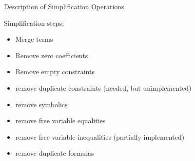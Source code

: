 \documentclass{book}
\begin{document}
\begin{section}{Description of Simplification Operations}

Simplification steps:

\begin{itemize}
\item Merge terms
\item Remove zero coefficients
\item Remove empty constraints
\item remove duplicate constraints (needed, but unimplemented)
\item remove symbolics
\item remove free variable equalities
\item remove free variable inequalities (partially implemented)
\item remove duplicate formulas
\end{itemize}

\end{section}
\end{document}
